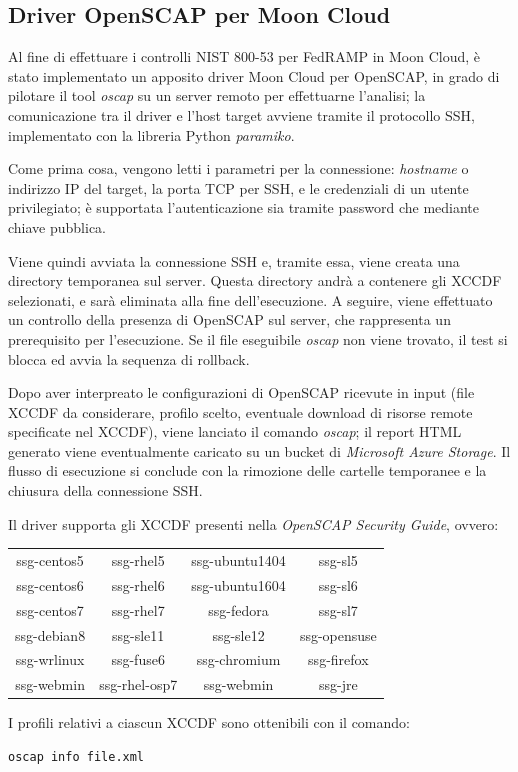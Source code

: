 \documentclass[../main.tex]{subfiles}
\begin{document}
\subsection{Driver OpenSCAP per Moon Cloud}
\label{sec:openscapmooncloud}
Al fine di effettuare i controlli NIST 800-53 per FedRAMP in Moon Cloud, è stato implementato un apposito driver Moon Cloud per OpenSCAP, in grado di pilotare il tool \textit{oscap} su un server remoto per effettuarne l'analisi; la comunicazione tra il driver e l'host target avviene tramite il protocollo SSH, implementato con la libreria Python \textit{paramiko}.

Come prima cosa, vengono  letti i parametri per la connessione: \textit{hostname} o indirizzo IP del target, la porta TCP per SSH, e le credenziali di un utente privilegiato; è supportata l'autenticazione sia tramite password che mediante chiave pubblica.

Viene quindi avviata la connessione SSH e, tramite essa, viene creata una directory temporanea sul server. Questa directory andrà a contenere gli XCCDF selezionati, e sarà eliminata alla fine dell'esecuzione.
A seguire, viene effettuato un controllo della presenza di OpenSCAP sul server, che rappresenta un prerequisito per l'esecuzione. Se il file eseguibile \textit{oscap} non viene trovato, il test si blocca ed avvia la sequenza di rollback.

Dopo aver interpreato le configurazioni di OpenSCAP ricevute in input (file XCCDF da considerare, profilo scelto, eventuale download di risorse remote specificate nel XCCDF), viene lanciato il comando \textit{oscap}; il report HTML generato viene eventualmente caricato su un bucket di \textit{Microsoft Azure Storage}.
Il flusso di esecuzione si conclude con la rimozione delle cartelle temporanee e la chiusura della connessione SSH.

Il driver supporta gli XCCDF presenti nella \textit{OpenSCAP Security Guide}, ovvero:
\begin{table}[H]
    \begin{tabulary}{\textwidth}{cccc}

         
        ssg-centos5 & ssg-rhel5     & ssg-ubuntu1404 & ssg-sl5      \\
        ssg-centos6 & ssg-rhel6     & ssg-ubuntu1604 & ssg-sl6      \\
        ssg-centos7 & ssg-rhel7     & ssg-fedora     & ssg-sl7      \\
        ssg-debian8 & ssg-sle11     & ssg-sle12      & ssg-opensuse \\
        ssg-wrlinux & ssg-fuse6     & ssg-chromium   & ssg-firefox  \\
        ssg-webmin  & ssg-rhel-osp7 & ssg-webmin     & ssg-jre

    \end{tabulary}
\end{table}
I profili relativi a ciascun XCCDF sono ottenibili con il comando:
\begin{Verbatim}[frame=single]
oscap info file.xml
\end{Verbatim}
\end{document}
